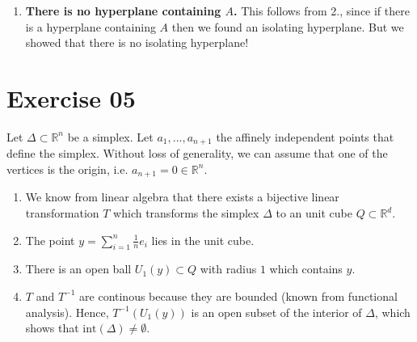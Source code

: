 \documentclass{article}
\begin{document}
\begin{enumerate}
    \item \textbf{There is no hyperplane containing $A$.} This follows from 2., since if there is a hyperplane containing $A$ then we found an isolating hyperplane. But we showed that there is no isolating hyperplane!
\end{enumerate}


\section*{Exercise 05}
Let $\Delta \subset\mathbb R^n$ be a simplex. Let $a_1,...,a_{n+1}$ the affinely independent points that define the simplex. Without loss of generality, we can assume that one of the vertices is the origin, i.e. $a_{n+1} = 0 \in \mathbb R^n$. 

\begin{enumerate}
    \item We know from linear algebra that there exists a bijective linear transformation $T$ which transforms the simplex $\Delta$ to an unit cube $Q \subset \mathbb R^d$.
    \item The point $y = \sum^n_{i=1}\frac{1}{n}e_i$ lies in the unit cube.
    \item There is an open ball $U_1(y) \subset Q$ with radius $1$ which contains $y$.
    \item $T$ and $T^{-1}$ are continous because they are bounded (known from functional analysis). Hence, $T^{-1}(U_1(y))$ is an open subset of the interior of $\Delta$, which shows that $\mathrm{int}(\Delta)\neq \emptyset$.
\end{enumerate}

\iffalse
\begin{tikzpicture}
    \draw[shift={(-3,0)}] (0,0) -- (2, 0.5) -- (2.5,1.5) -- (0.5, 2) -- (0,0)  
    (2, 0.5) node[anchor=north] {$\Delta$} (1,1) circle (0.05) ;
    \draw (0,0) rectangle (2,2) (2,0) node[anchor=north] {$Q$};
    \draw (1,1) circle (1cm);
    \draw[fill=black] (1,1) circle (0.05)node[anchor=west] {$y$};
\end{tikzpicture}
\fi
\end{document}
